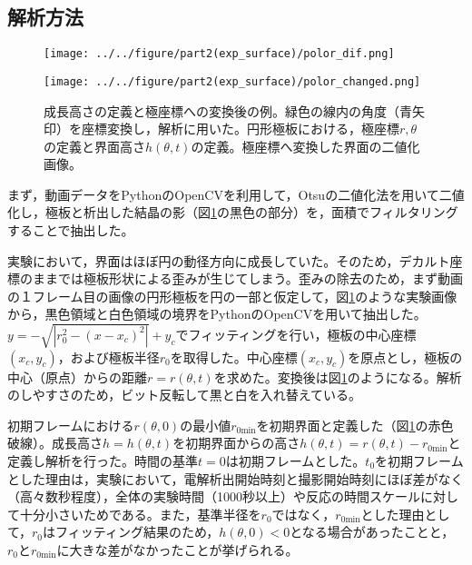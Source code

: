 \documentclass[autodetect-engine,dvi=dvipdfmx,a4paper,ja=standard,oneside,openany,11pt]{bxjsbook}
\begin{document}
\subsection{解析方法}
\begin{figure}[htbp]
  \begin{minipage}
    {0.64\textwidth}
    \subcaption{}
    \centering
    \texttt{[image: ../../figure/part2(exp\_surface)/polor\_dif.png]}
    \label{fig:surface_hight_def}
  \end{minipage}
  \begin{minipage}
    {0.32\textwidth}
    \subcaption{}
    \centering
    \texttt{[image: ../../figure/part2(exp\_surface)/polor\_changed.png]}
    \label{fig:polor_changed}
  \end{minipage}
  \caption{成長高さの定義と極座標への変換後の例。緑色の線内の角度（青矢印）を座標変換し，解析に用いた。円形極板における，極座標$r,\theta$の定義と界面高さ$h(\theta,t)$の定義。極座標へ変換した界面の二値化画像。}
  \label{fig:surface_hight_def_polor_changed}
\end{figure}
まず，動画データをPythonのOpenCVを利用して，Otsuの二値化法を用いて二値化し，極板と析出した結晶の影（図\ref{fig:surface_hight_def_polor_changed}の黒色の部分）を，面積でフィルタリングすることで抽出した。

実験において，界面はほぼ円の動径方向に成長していた。そのため，デカルト座標のままでは極板形状による歪みが生じてしまう。歪みの除去のため，まず動画の１フレーム目の画像の円形極板を円の一部と仮定して，図\ref{fig:surface_hight_def_polor_changed}のような実験画像から，黒色領域と白色領域の境界をPythonのOpenCVを用いて抽出した。$y=-\sqrt{|r_0^2-(x-x_c)^2|}+y_c$でフィッティングを行い，極板の中心座標$(x_c,y_c)$，および極板半径$r_0$を取得した。中心座標$(x_c,y_c)$を原点とし，極板の中心（原点）からの距離$r=r(\theta,t)$を求めた。変換後は図\ref{fig:surface_hight_def_polor_changed}のようになる。解析のしやすさのため，ビット反転して黒と白を入れ替えている。

初期フレームにおける$r(\theta,0)$の最小値$r_{0\mathrm{min}}$を初期界面と定義した（図\ref{fig:surface_hight_def_polor_changed}の赤色破線）。成長高さ$h=h(\theta,t)$を初期界面からの高さ$h(\theta,t)=r(\theta,t)-r_{0\mathrm{min}}$と定義し解析を行った。時間の基準$t=0$は初期フレームとした。$t_0$を初期フレームとした理由は，実験において，電解析出開始時刻と撮影開始時刻にほぼ差がなく（高々数秒程度），全体の実験時間（1000秒以上）や反応の時間スケールに対して十分小さいためである。また，基準半径を$r_0$ではなく，$r_{0\mathrm{min}}$とした理由として，$r_0$はフィッティング結果のため，$h(\theta,0)<0$となる場合があったことと，$r_0$と$r_{0\mathrm{min}}$に大きな差がなかったことが挙げられる。
\end{document}
